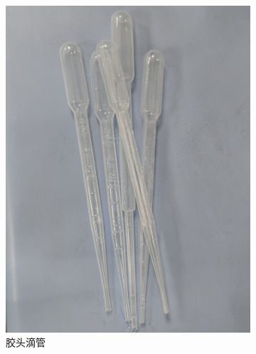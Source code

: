 \documentclass[a4paper]{report} %
\begin{document}
\begin{figure}[htbp]
    \begin{subfigure}{0.22\textwidth}
        \includegraphics[width=\linewidth]{胶头滴管.jpg}
        \caption{胶头滴管}
    \end{subfigure}
    \begin{subfigure}{0.22\textwidth}

\end{subfigure}
\end{figure}
\end{document}
